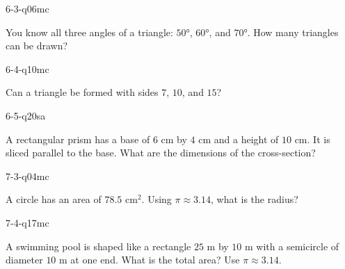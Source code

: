 \begin{practiceQuestion}{6-3-q06}{mc}
\begin{questionText}
You know all three angles of a triangle: $50°$, $60°$, and $70°$. How many triangles can be drawn?
\end{questionText}
\end{practiceQuestion}

\begin{practiceQuestion}{6-4-q10}{mc}
\begin{questionText}
Can a triangle be formed with sides $7$, $10$, and $15$?
\end{questionText}
\end{practiceQuestion}

\begin{practiceQuestion}{6-5-q20}{sa}
\begin{questionText}
A rectangular prism has a base of $6$ cm by $4$ cm and a height of $10$ cm. It is sliced parallel to the base. What are the dimensions of the cross-section?
\end{questionText}
\end{practiceQuestion}

\begin{practiceQuestion}{7-3-q04}{mc}
\begin{questionText}
A circle has an area of $78.5$ cm$^2$. Using $\pi \approx 3.14$, what is the radius?
\end{questionText}
\end{practiceQuestion}

\begin{practiceQuestion}{7-4-q17}{mc}
\begin{questionText}
A swimming pool is shaped like a rectangle $25$ m by $10$ m with a semicircle of diameter $10$ m at one end. What is the total area? Use $\pi \approx 3.14$.
\end{questionText}
\end{practiceQuestion}

